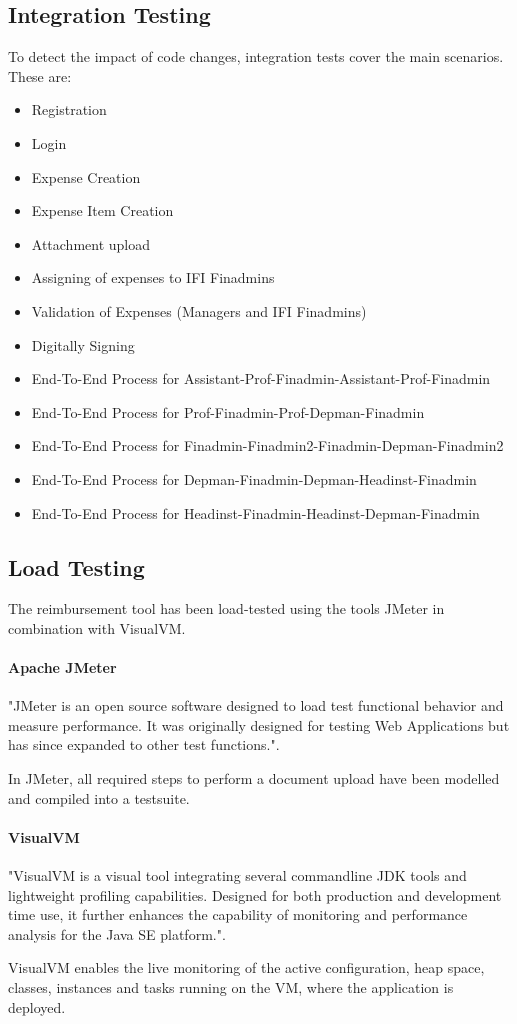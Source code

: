 \subsection{Integration Testing}
To detect the impact of code changes, integration tests cover the main scenarios. These are:
\begin{itemize}
	\item Registration
	\item Login
	\item Expense Creation
	\item Expense Item Creation
	\item Attachment upload
	\item Assigning of expenses to IFI Finadmins
	\item Validation of Expenses (Managers and IFI Finadmins)
	\item Digitally Signing
	\item End-To-End Process for Assistant-Prof-Finadmin-Assistant-Prof-Finadmin
	\item End-To-End Process for Prof-Finadmin-Prof-Depman-Finadmin
	\item End-To-End Process for Finadmin-Finadmin2-Finadmin-Depman-Finadmin2
	\item End-To-End Process for Depman-Finadmin-Depman-Headinst-Finadmin
	\item End-To-End Process for Headinst-Finadmin-Headinst-Depman-Finadmin
\end{itemize}


\subsection{Load Testing}
The reimbursement tool has been load-tested using the tools JMeter\cite{jmeter} in combination with VisualVM\cite{visualvm}.

\paragraph{Apache JMeter} "JMeter is an open source software designed to load test functional behavior and measure performance. It was originally designed for testing Web Applications but has since expanded to other test functions."\cite{jmeter}.\par

In JMeter, all required steps to perform a document upload have been modelled and compiled into a testsuite.

\paragraph{VisualVM} "VisualVM is a visual tool integrating several commandline JDK tools and lightweight profiling capabilities. Designed for both production and development time use, it further enhances the capability of monitoring and performance analysis for the Java SE platform."\cite{visualvm}.\par 
VisualVM enables the live monitoring of the active configuration, heap space, classes, instances and tasks running on the VM, where the application is deployed.\par

